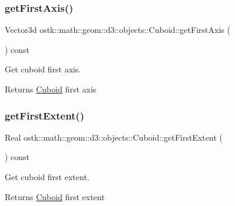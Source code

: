 \subsubsection{\texorpdfstring{get\+First\+Axis()}{getFirstAxis()}}
{\footnotesize\ttfamily Vector3d ostk\+::math\+::geom\+::d3\+::objects\+::\+Cuboid\+::get\+First\+Axis (\begin{DoxyParamCaption}{ }\end{DoxyParamCaption}) const}



Get cuboid first axis. 

\begin{DoxyReturn}{Returns}
\hyperlink{classostk_1_1math_1_1geom_1_1d3_1_1objects_1_1_cuboid}{Cuboid} first axis 
\end{DoxyReturn}
\mbox{\label{classostk_1_1math_1_1geom_1_1d3_1_1objects_1_1_cuboid_a5a86a357cd12deb1cf51c48ef8c3e406}} 
\subsubsection{\texorpdfstring{get\+First\+Extent()}{getFirstExtent()}}
{\footnotesize\ttfamily Real ostk\+::math\+::geom\+::d3\+::objects\+::\+Cuboid\+::get\+First\+Extent (\begin{DoxyParamCaption}{ }\end{DoxyParamCaption}) const}



Get cuboid first extent. 

\begin{DoxyReturn}{Returns}
\hyperlink{classostk_1_1math_1_1geom_1_1d3_1_1objects_1_1_cuboid}{Cuboid} first extent 
\end{DoxyReturn}
\mbox{\label{classostk_1_1math_1_1geom_1_1d3_1_1objects_1_1_cuboid_add00ad2c59ec4a2e64d655e9ad2810a8}} 
